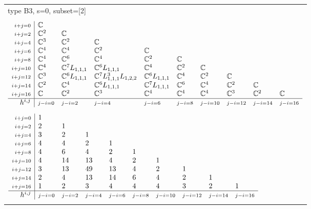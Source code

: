 \documentclass[crop,border=2mm]{standalone}
\begin{document}
\begin{tabular}{l}
{\huge type B3, s=0, subset=[2]}\\ \\


$\displaystyle
\begin{array}{r|l l l l l l l l l}
	{\scriptstyle i+j=0}&\mathbb{C}&&&&&&&&\\
	{\scriptstyle i+j=2}&\mathbb{C}^{2}&\mathbb{C}&&&&&&&\\
	{\scriptstyle i+j=4}&\mathbb{C}^{3}&\mathbb{C}^{2}&\mathbb{C}&&&&&&\\
	{\scriptstyle i+j=6}&\mathbb{C}^{4}&\mathbb{C}^{4}&\mathbb{C}^{2}&\mathbb{C}&&&&&\\
	{\scriptstyle i+j=8}&\mathbb{C}^{4}&\mathbb{C}^{6}&\mathbb{C}^{4}&\mathbb{C}^{2}&\mathbb{C}&&&&\\
	{\scriptstyle i+j=10}&\mathbb{C}^{4}&\mathbb{C}^{7}L_{1,1,1}&\mathbb{C}^{6}L_{1,1,1}&\mathbb{C}^{4}&\mathbb{C}^{2}&\mathbb{C}&&&\\
	{\scriptstyle i+j=12}&\mathbb{C}^{3}&\mathbb{C}^{6}L_{1,1,1}&\mathbb{C}^{7}L_{1,1,1}^{3}L_{1,2,2}&\mathbb{C}^{6}L_{1,1,1}&\mathbb{C}^{4}&\mathbb{C}^{2}&\mathbb{C}&&\\
	{\scriptstyle i+j=14}&\mathbb{C}^{2}&\mathbb{C}^{4}&\mathbb{C}^{6}L_{1,1,1}&\mathbb{C}^{7}L_{1,1,1}&\mathbb{C}^{6}&\mathbb{C}^{4}&\mathbb{C}^{2}&\mathbb{C}&\\
	{\scriptstyle i+j=16}&\mathbb{C}&\mathbb{C}^{2}&\mathbb{C}^{3}&\mathbb{C}^{4}&\mathbb{C}^{4}&\mathbb{C}^{4}&\mathbb{C}^{3}&\mathbb{C}^{2}&\mathbb{C}\\
	\hline h^{i,j}&{\scriptstyle j-i=0}&{\scriptstyle j-i=2}&{\scriptstyle j-i=4}&{\scriptstyle j-i=6}&{\scriptstyle j-i=8}&{\scriptstyle j-i=10}&{\scriptstyle j-i=12}&{\scriptstyle j-i=14}&{\scriptstyle j-i=16}
\end{array}
$ \\ \\


$\displaystyle
\begin{array}{r|l l l l l l l l l}
	{\scriptstyle i+j=0}&1&&&&&&&&\\
	{\scriptstyle i+j=2}&2&1&&&&&&&\\
	{\scriptstyle i+j=4}&3&2&1&&&&&&\\
	{\scriptstyle i+j=6}&4&4&2&1&&&&&\\
	{\scriptstyle i+j=8}&4&6&4&2&1&&&&\\
	{\scriptstyle i+j=10}&4&14&13&4&2&1&&&\\
	{\scriptstyle i+j=12}&3&13&49&13&4&2&1&&\\
	{\scriptstyle i+j=14}&2&4&13&14&6&4&2&1&\\
	{\scriptstyle i+j=16}&1&2&3&4&4&4&3&2&1\\
	\hline h^{i,j}&{\scriptstyle j-i=0}&{\scriptstyle j-i=2}&{\scriptstyle j-i=4}&{\scriptstyle j-i=6}&{\scriptstyle j-i=8}&{\scriptstyle j-i=10}&{\scriptstyle j-i=12}&{\scriptstyle j-i=14}&{\scriptstyle j-i=16}
\end{array}
$ \\ \\



\end{tabular}
\end{document}
